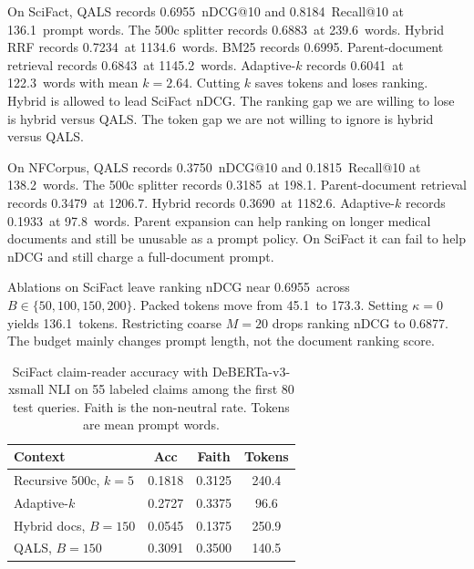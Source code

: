 \documentclass[preprint,12pt,authoryear]{elsarticle}
\newcommand{\ScifactQalsNdcg}{0.6955}
\newcommand{\ScifactQalsRec}{0.8184}
\newcommand{\ScifactQalsTok}{136.1}
\newcommand{\ScifactLcNdcg}{0.6883}
\newcommand{\ScifactLcTok}{239.6}
\newcommand{\ScifactParentNdcg}{0.6843}
\newcommand{\ScifactParentTok}{1145.2}
\newcommand{\ScifactHybridNdcg}{0.7234}
\newcommand{\ScifactHybridTok}{1134.6}
\newcommand{\ScifactBmNdcg}{0.6995}
\newcommand{\NfQalsNdcg}{0.3750}
\newcommand{\NfQalsRec}{0.1815}
\newcommand{\NfQalsTok}{138.2}
\newcommand{\NfLcNdcg}{0.3185}
\newcommand{\NfLcTok}{198.1}
\newcommand{\NfParentNdcg}{0.3479}
\newcommand{\NfParentTok}{1206.7}
\newcommand{\NfHybridNdcg}{0.3690}
\newcommand{\NfHybridTok}{1182.6}
\newcommand{\ScifactAdaptkNdcg}{0.6041}
\newcommand{\ScifactAdaptkTok}{122.3}
\newcommand{\NfAdaptkNdcg}{0.1933}
\newcommand{\NfAdaptkTok}{97.8}
\newcommand{\AblatBfiftyTok}{45.1}
\newcommand{\AblatBtonefiftyNdcg}{0.6955}
\newcommand{\AblatBtwohundredTok}{173.3}
\newcommand{\AblatKappaZeroTok}{136.1}
\newcommand{\AblatMtwentyNdcg}{0.6877}
\newcommand{\RagQalsAcc}{0.3091}
\newcommand{\RagQalsFaith}{0.3500}
\newcommand{\RagQalsTok}{140.5}
\newcommand{\RagLcAcc}{0.1818}
\newcommand{\RagLcFaith}{0.3125}
\newcommand{\RagLcTok}{240.4}
\newcommand{\RagParentAcc}{0.2727}
\newcommand{\RagParentFaith}{0.3375}
\newcommand{\RagParentTok}{96.6}
\newcommand{\RagHybridAcc}{0.0545}
\newcommand{\RagHybridFaith}{0.1375}
\newcommand{\RagHybridTok}{250.9}
\begin{document}
On SciFact, QALS records \ScifactQalsNdcg\ nDCG@10 and \ScifactQalsRec\ Recall@10 at \ScifactQalsTok\ prompt words. The 500c splitter records \ScifactLcNdcg\ at \ScifactLcTok\ words. Hybrid RRF records \ScifactHybridNdcg\ at \ScifactHybridTok\ words. BM25 records \ScifactBmNdcg. Parent-document retrieval records \ScifactParentNdcg\ at \ScifactParentTok\ words. Adaptive-\(k\) records \ScifactAdaptkNdcg\ at \ScifactAdaptkTok\ words with mean \(k=2.64\). Cutting \(k\) saves tokens and loses ranking. Hybrid is allowed to lead SciFact nDCG. The ranking gap we are willing to lose is hybrid versus QALS. The token gap we are not willing to ignore is hybrid versus QALS.

On NFCorpus, QALS records \NfQalsNdcg\ nDCG@10 and \NfQalsRec\ Recall@10 at \NfQalsTok\ words. The 500c splitter records \NfLcNdcg\ at \NfLcTok. Parent-document retrieval records \NfParentNdcg\ at \NfParentTok. Hybrid records \NfHybridNdcg\ at \NfHybridTok. Adaptive-\(k\) records \NfAdaptkNdcg\ at \NfAdaptkTok\ words. Parent expansion can help ranking on longer medical documents and still be unusable as a prompt policy. On SciFact it can fail to help nDCG and still charge a full-document prompt.

Ablations on SciFact leave ranking nDCG near \AblatBtonefiftyNdcg\ across \(B\in\{50,100,150,200\}\). Packed tokens move from \AblatBfiftyTok\ to \AblatBtwohundredTok. Setting \(\kappa=0\) yields \AblatKappaZeroTok\ tokens. Restricting coarse \(M=20\) drops ranking nDCG to \AblatMtwentyNdcg. The budget mainly changes prompt length, not the document ranking score.

\begin{table}[t]
\centering
\caption{SciFact claim-reader accuracy with DeBERTa-v3-xsmall NLI on 55 labeled claims among the first 80 test queries. Faith is the non-neutral rate. Tokens are mean prompt words.}
\label{tab:reader}
\begin{tabular}{lccc}
\toprule
Context & Acc & Faith & Tokens \\
\midrule
Recursive 500c, \(k=5\) & \RagLcAcc & \RagLcFaith & \RagLcTok \\
Adaptive-\(k\) & \RagParentAcc & \RagParentFaith & \RagParentTok \\
Hybrid docs, \(B=150\) & \RagHybridAcc & \RagHybridFaith & \RagHybridTok \\
QALS, \(B=150\) & \RagQalsAcc & \RagQalsFaith & \RagQalsTok \\
\bottomrule
\end{tabular}
\end{table}
\end{document}
